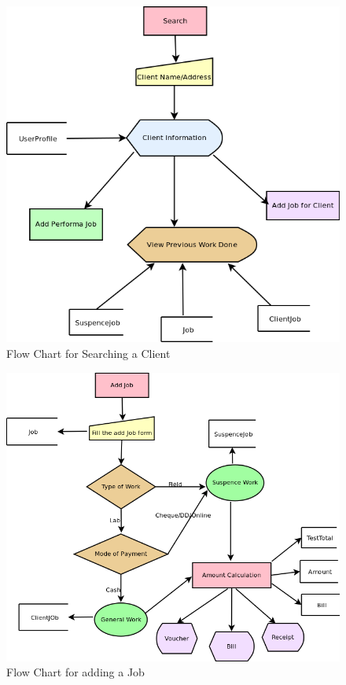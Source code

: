 \begin{figure}[h]

\centering \includegraphics[scale=0.7]{images/search.png}
\caption{Flow Chart for Searching a Client}
\end{figure}

\newpage
\begin{figure}[h]
\centering \includegraphics[scale=0.7]{images/addjob.png}
\caption{Flow Chart for adding a Job}
\end{figure}

